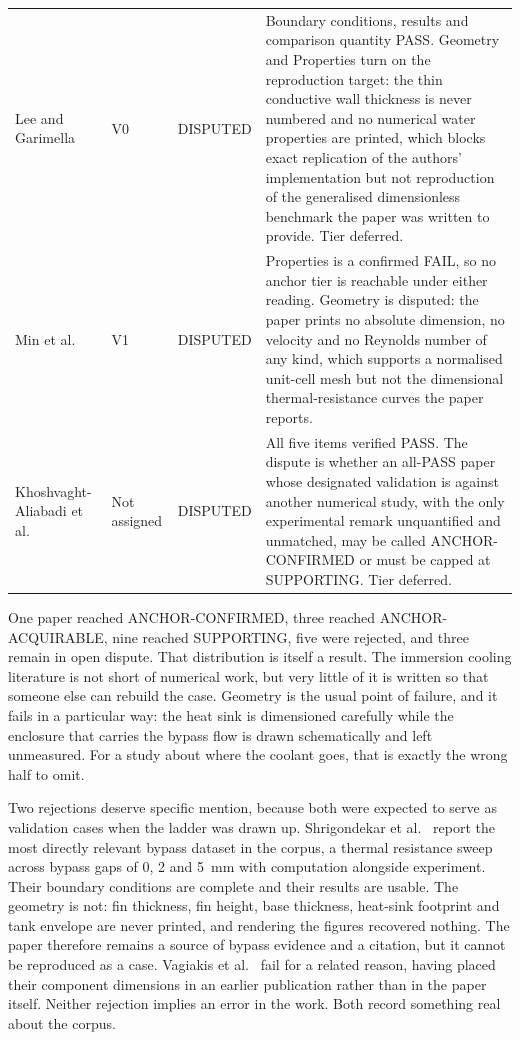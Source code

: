 \begin{longtable}{p{}p{}p{}p{}}
Lee and Garimella~\cite{lee2006} & V0 & DISPUTED & Boundary conditions, results and comparison
quantity PASS. Geometry and Properties turn on the reproduction target: the thin conductive wall
thickness is never numbered and no numerical water properties are printed, which blocks exact
replication of the authors' implementation but not reproduction of the generalised dimensionless
benchmark the paper was written to provide. Tier deferred. \\
Min et al.~\cite{min2004} & V1 & DISPUTED & Properties is a confirmed FAIL, so no anchor tier is
reachable under either reading. Geometry is disputed: the paper prints no absolute dimension, no
velocity and no Reynolds number of any kind, which supports a normalised unit-cell mesh but not
the dimensional thermal-resistance curves the paper reports. \\
Khoshvaght-Aliabadi et al.~\cite{khoshvaghtaliabadi2025} & Not assigned & DISPUTED & All five items
verified PASS. The dispute is whether an all-PASS paper whose designated validation is against
another numerical study, with the only experimental remark unquantified and unmatched, may be
called ANCHOR-CONFIRMED or must be capped at SUPPORTING. Tier deferred. \\
\end{longtable}
\endgroup

One paper reached ANCHOR-CONFIRMED, three reached ANCHOR-ACQUIRABLE, nine reached SUPPORTING, five
were rejected, and three remain in open dispute. That distribution is itself a result. The
immersion cooling literature is not short of numerical work, but very little of it is written so
that someone else can rebuild the case. Geometry is the usual point of failure, and it fails in a
particular way: the heat sink is dimensioned carefully while the enclosure that carries the bypass
flow is drawn schematically and left unmeasured. For a study about where the coolant goes, that is
exactly the wrong half to omit.

Two rejections deserve specific mention, because both were expected to serve as validation cases
when the ladder was drawn up. Shrigondekar et al.~\cite{shrigondekar2023} report the most directly
relevant bypass dataset in the corpus, a thermal resistance sweep across bypass gaps of 0, 2 and
5~mm with computation alongside experiment. Their boundary conditions are complete and their
results are usable. The geometry is not: fin thickness, fin height, base thickness, heat-sink
footprint and tank envelope are never printed, and rendering the figures recovered nothing. The
paper therefore remains a source of bypass evidence and a citation, but it cannot be reproduced as
a case. Vagiakis et al.~\cite{vagiakis2025} fail for a related reason, having placed their
component dimensions in an earlier publication rather than in the paper itself. Neither rejection
implies an error in the work. Both record something real about the corpus.

